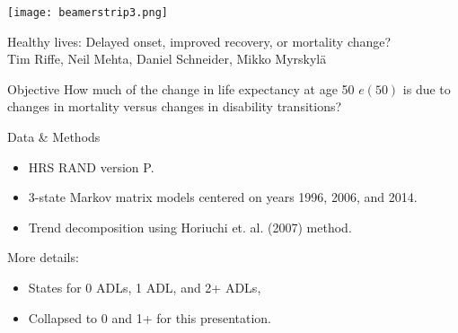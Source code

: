 \documentclass[20pt,usenames,dvipsnames]{beamer}
\begin{document}

\begin{frame}[plain]
	\vspace{-3cm}
 \centerline{\texttt{[image: beamerstrip3.png]}}

	
	\huge
	\vspace{1em}
	
	Healthy lives: Delayed onset, improved recovery, or mortality
change?\\
	\vspace{1em}
	\large 
	Tim Riffe, Neil Mehta, Daniel Schneider, Mikko Myrskyl\"a 
\end{frame}
\begin{frame}[plain]
\Large
\begin{block}{Objective}
How much of the change in life expectancy at age 50 $e(50)$ is due to changes in mortality versus changes in disability transitions?
\end{block}
\end{frame}
\begin{frame}[plain]
\Large
\begin{block}{Data \& Methods}
\begin{itemize}
\item HRS RAND version P. 
\item 3-state Markov matrix models centered on years 1996, 2006, and 2014. 
\item Trend decomposition using Horiuchi et. al. (2007) method.
\end{itemize}
\end{block}
\pause
More details:
\begin{itemize}
\item States for 0 ADLs, 1 ADL, and 2+ ADLs, 
\item Collapsed to 0 and 1+ for this presentation.
\end{itemize}
\end{frame}
\end{document}
